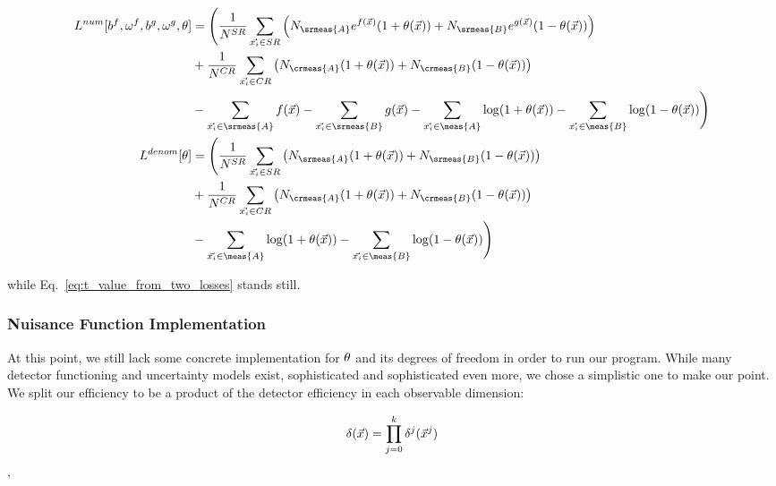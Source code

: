 \documentclass[../../ddppaper2.tex]{subfiles}
\begin{document}
\begin{equation}
\label{eq:discrete_loss_functions}
\begin{aligned}
L^{num}[b^f, \omega^f, b^g, \omega^g, \nparam] &= \Bigg(
    \dfrac{1}{N^{SR}} \sum\limits_{\event \in SR} \left(
        {N_\srmeas{A}} e^{f(\anyevent)} (1 + {\nparam(\anyevent)})
        + {N_\srmeas{B}} e^{g(\anyevent)} (1 - {\nparam(\anyevent)})
    \right) \\&
    + \dfrac{1}{N^{CR}} \sum\limits_{\event \in CR} \left(
        {N_\crmeas{A}} (1 + {\nparam(\anyevent)})
        + {N_\crmeas{B}} (1 - {\nparam(\anyevent)})
    \right)
    \\&
    - \sum\limits_{\event \in \srmeas{A}} f(\anyevent)
    - \sum\limits_{\event \in \srmeas{B}} g(\anyevent)
    - \sum\limits_{\event \in \meas{A}} \log(1 + {\nparam(\anyevent)})
    - \sum\limits_{\event \in \meas{B}} \log(1 - {\nparam(\anyevent)})
\Bigg)
\\
L^{denom}[\nparam] &= \Bigg(
    \dfrac{1}{N^{SR}} \sum\limits_{\event \in SR} \left(
        {N_\srmeas{A}} (1 + {\nparam(\anyevent)})
        + {N_\srmeas{B}} (1 - {\nparam(\anyevent)})
    \right) \\&
    + \dfrac{1}{N^{CR}} \sum\limits_{\event \in CR} \left(
        {N_\crmeas{A}} (1 + {\nparam(\anyevent)})
        + {N_\crmeas{B}} (1 - {\nparam(\anyevent)})
    \right)
    \\&
    - \sum\limits_{\event \in \meas{A}} \log(1 + {\nparam(\anyevent)})
    - \sum\limits_{\event \in \meas{B}} \log(1 - {\nparam(\anyevent)})
\Bigg)
\end{aligned}
\end{equation}

\noindent while Eq.~\ref{eq:t_value_from_two_losses} stands still.

\subsubsection{Nuisance Function Implementation}

At this point, we still lack some concrete implementation for ${\theta}$ and its degrees of freedom in order to run our program. While many detector functioning and uncertainty models exist, sophisticated and sophisticated even more, we chose a simplistic one to make our point. We split our efficiency to be a product of the detector efficiency in each observable dimension:

\begin{equation}
    \delta(\vec{{x}}) = \prod\limits_{j=0}^k \delta^j(\vec{{x}}^j)
\end{equation},
\end{document}
